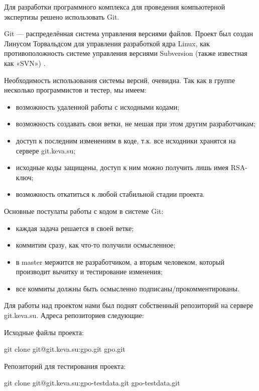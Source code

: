 Для разработки программного комплекса для проведения компьютерной экспертизы решено использовать Git.

Git  — распределённая система управления версиями файлов. Проект был создан Линусом Торвальдсом для управления разработкой ядра Linux,  как противоположность  системе управления версиями Subversion (также известная как «SVN») \cite{progit}.

Необходимость использования системы версий, очевидна. Так как в группе несколько программистов и тестер, мы имеем:
\begin{itemize}
\item возможность удаленной работы с исходными кодами;
\item возможность создавать свои ветки, не мешая при этом другим разработчикам;
\item доступ к последним изменениям в коде, т.к. все исходники хранятся на сервере git.keva.su;
\item исходные коды защищены, доступ к ним можно получить лишь имея RSA-ключ;
\item возможность откатиться к любой стабильной стадии проекта.
\end{itemize}

Основные постулаты работы с кодом в системе Git:

\begin{itemize}
\item каждая задача решается в своей ветке;
\item коммитим сразу, как что-то получили осмысленное;
\item в master мержится не разработчиком, а вторым человеком, который производит вычитку и тестирование изменения;
\item все коммиты должны быть осмысленно подписаны/прокомментированы.
\end{itemize}

Для работы над проектом нами был поднят собственный репозиторий на сервере git.keva.su.
Адреса репозиториев следующие:

Исходные файлы проекта:

git clone git@git.keva.su:gpo.git gpo.git

Репозиторий для тестирования проекта:

git clone git@git.keva.su:gpo-testdata.git gpo-testdata.git
